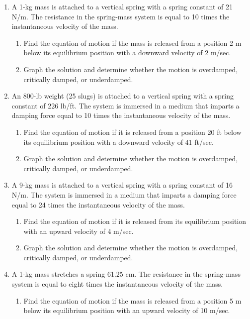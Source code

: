 \documentclass{exercises}
\begin{document}
\begin{enumerate}[start=1]
\begin{enumerate}[label=(\alph*)]
  \item At what time does the block first pass through the equilibrium position?
\end{enumerate}
\item A 1-kg mass is attached to a vertical spring with a spring constant of 21 N/m. The resistance in the spring-mass system is equal to 10 times the instantaneous velocity of the mass.
\begin{enumerate}[label=(\alph*)]
  \item Find the equation of motion if the mass is released from a position 2 m below its equilibrium position with a downward velocity of 2 m/sec.
  \item Graph the solution and determine whether the motion is overdamped, critically damped, or underdamped.
\end{enumerate}
\item An 800-lb weight (25 slugs) is attached to a vertical spring with a spring constant of 226 lb/ft. The system is immersed in a medium that imparts a damping force equal to 10 times the instantaneous velocity of the mass.
\begin{enumerate}[label=(\alph*)]
  \item Find the equation of motion if it is released from a position 20 ft below its equilibrium position with a downward velocity of 41 ft/sec.
  \item Graph the solution and determine whether the motion is overdamped, critically damped, or underdamped.
\end{enumerate}
\item A 9-kg mass is attached to a vertical spring with a spring constant of 16 N/m. The system is immersed in a medium that imparts a damping force equal to 24 times the instantaneous velocity of the mass.
\begin{enumerate}[label=(\alph*)]
  \item Find the equation of motion if it is released from its equilibrium position with an upward velocity of 4 m/sec.
  \item Graph the solution and determine whether the motion is overdamped, critically damped, or underdamped.
\end{enumerate}
\item A 1-kg mass stretches a spring 61.25 cm. The resistance in the spring-mass system is equal to eight times the instantaneous velocity of the mass.
\begin{enumerate}[label=(\alph*)]
  \item Find the equation of motion if the mass is released from a position 5 m below its equilibrium position with an upward velocity of 10 m/sec.

\end{enumerate}
\end{enumerate}
\end{document}
